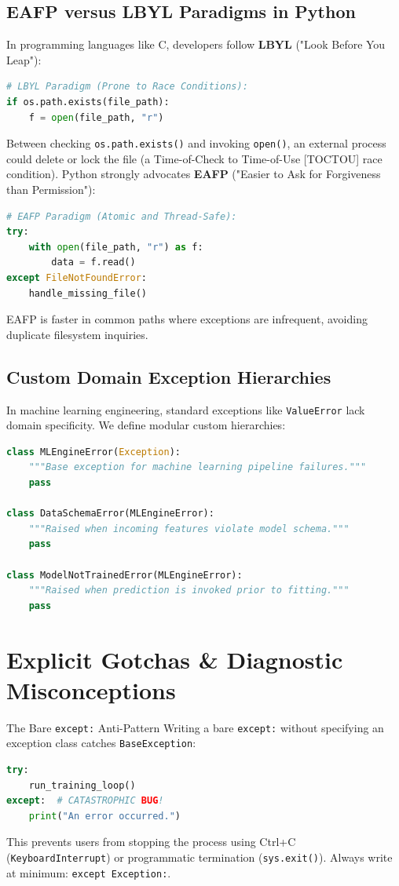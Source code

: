 \subsection{EAFP versus LBYL Paradigms in Python}
In programming languages like C, developers follow \textbf{LBYL} ("Look Before You Leap"):
\begin{lstlisting}[language=Python]
# LBYL Paradigm (Prone to Race Conditions):
if os.path.exists(file_path):
    f = open(file_path, "r")
\end{lstlisting}
Between checking \texttt{os.path.exists()} and invoking \texttt{open()}, an external process could delete or lock the file (a Time-of-Check to Time-of-Use [TOCTOU] race condition).
Python strongly advocates \textbf{EAFP} ("Easier to Ask for Forgiveness than Permission"):
\begin{lstlisting}[language=Python]
# EAFP Paradigm (Atomic and Thread-Safe):
try:
    with open(file_path, "r") as f:
        data = f.read()
except FileNotFoundError:
    handle_missing_file()
\end{lstlisting}
EAFP is faster in common paths where exceptions are infrequent, avoiding duplicate filesystem inquiries.

\subsection{Custom Domain Exception Hierarchies}
In machine learning engineering, standard exceptions like \texttt{ValueError} lack domain specificity. We define modular custom hierarchies:
\begin{lstlisting}[language=Python]
class MLEngineError(Exception):
    """Base exception for machine learning pipeline failures."""
    pass

class DataSchemaError(MLEngineError):
    """Raised when incoming features violate model schema."""
    pass

class ModelNotTrainedError(MLEngineError):
    """Raised when prediction is invoked prior to fitting."""
    pass
\end{lstlisting}

\section{Explicit Gotchas \& Diagnostic Misconceptions}

\begin{trapbox}{The Bare \texttt{except:} Anti-Pattern}
Writing a bare \texttt{except:} without specifying an exception class catches \texttt{BaseException}:
\begin{lstlisting}[language=Python]
try:
    run_training_loop()
except:  # CATASTROPHIC BUG!
    print("An error occurred.")
\end{lstlisting}
This prevents users from stopping the process using Ctrl+C (\texttt{KeyboardInterrupt}) or programmatic termination (\texttt{sys.exit()}). Always write at minimum: \texttt{except Exception:}.
\end{trapbox}

